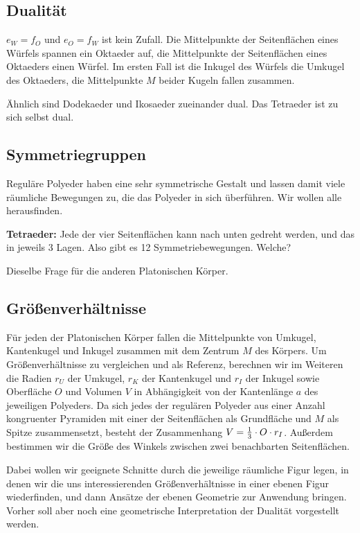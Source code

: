 \documentclass[11pt]{article}
\begin{document}
\subsection*{Dualität}

$e_W=f_O$ und $e_O=f_W$ ist kein Zufall. Die Mittelpunkte der Seitenflächen
eines Würfels spannen ein Oktaeder auf, die Mittelpunkte der Seitenflächen
eines Oktaeders einen Würfel. Im ersten Fall ist die Inkugel des Würfels die
Umkugel des Oktaeders, die Mittelpunkte $M$ beider Kugeln fallen zusammen.

Ähnlich sind Dodekaeder und Ikosaeder zueinander dual.  Das Tetraeder ist zu
sich selbst dual.

\subsection*{Symmetriegruppen}

Reguläre Polyeder haben eine sehr symmetrische Gestalt und lassen damit viele
räumliche Bewegungen zu, die das Polyeder in sich überführen. Wir wollen alle
herausfinden.  

\textbf{Tetraeder:} Jede der vier Seitenflächen kann nach unten gedreht
werden, und das in jeweils 3 Lagen. Also gibt es 12 Symmetriebewegungen.
Welche?

Dieselbe Frage für die anderen Platonischen Körper.

\subsection*{Größenverhältnisse}

Für jeden der Platonischen Körper fallen die Mittelpunkte von Umkugel,
Kantenkugel und Inkugel zusammen mit dem Zentrum $M$ des Körpers.  Um
Größenverhältnisse zu vergleichen und als Referenz, berechnen wir im Weiteren
die Radien $r_U$ der Umkugel, $r_K$ der Kantenkugel und $r_I$ der Inkugel
sowie Oberfläche $O$ und Volumen $V$ in Abhängigkeit von der Kantenlänge $a$
des jeweiligen Polyeders.  Da sich jedes der regulären Polyeder aus einer
Anzahl kongruenter Pyramiden mit einer der Seitenflächen als Grundfläche und
$M$ als Spitze zusammensetzt, besteht der Zusammenhang $V=\frac13\cdot O\cdot r_I$.
Außerdem bestimmen wir die Größe des Winkels zwischen zwei benachbarten
Seitenflächen.

Dabei wollen wir geeignete Schnitte durch die jeweilige räumliche Figur legen,
in denen wir die uns interessierenden Größenverhältnisse in einer ebenen Figur
wiederfinden, und dann Ansätze der ebenen Geometrie zur Anwendung bringen.
Vorher soll aber noch eine geometrische Interpretation der Dualität
vorgestellt werden. 
\end{document}

